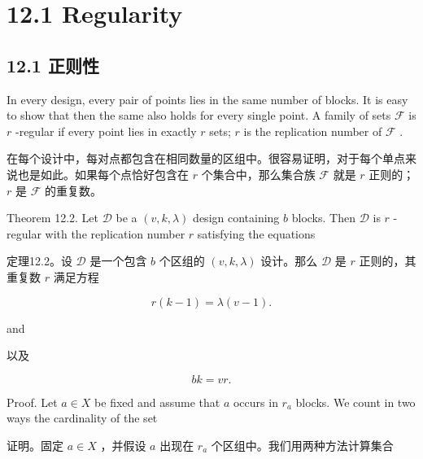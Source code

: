 \documentclass[10pt]{article}
\begin{document}
\section*{12.1 Regularity}

\begin{tcolorbox}\relax
\section*{12.1 正则性}
\end{tcolorbox}

In every design, every pair of points lies in the same number of blocks. It is easy to show that then the same also holds for every single point. A family of sets \(\mathcal{F}\) is \(r\) -regular if every point lies in exactly \(r\) sets; \(r\) is the replication number of \(\mathcal{F}\) .

\begin{tcolorbox}\relax
在每个设计中，每对点都包含在相同数量的区组中。很容易证明，对于每个单点来说也是如此。如果每个点恰好包含在 \(r\) 个集合中，那么集合族 \(\mathcal{F}\) 就是 \(r\) 正则的； \(r\) 是 \(\mathcal{F}\) 的重复数。
\end{tcolorbox}

Theorem 12.2. Let \(\mathcal{D}\) be a \(\left( {v,k,\lambda }\right)\) design containing \(b\) blocks. Then \(\mathcal{D}\) is \(r\) -regular with the replication number \(r\) satisfying the equations

\begin{tcolorbox}\relax
定理12.2。设 \(\mathcal{D}\) 是一个包含 \(b\) 个区组的 \(\left( {v,k,\lambda }\right)\) 设计。那么 \(\mathcal{D}\) 是 \(r\) 正则的，其重复数 \(r\) 满足方程
\end{tcolorbox}

\[
r\left( {k - 1}\right)  = \lambda \left( {v - 1}\right) . \tag{12.1}
\]

and

\begin{tcolorbox}\relax
以及
\end{tcolorbox}

\[
{bk} = {vr}. \tag{12.2}
\]

Proof. Let \(a \in  X\) be fixed and assume that \(a\) occurs in \({r}_{a}\) blocks. We count in two ways the cardinality of the set

\begin{tcolorbox}\relax
证明。固定 \(a \in  X\) ，并假设 \(a\) 出现在 \({r}_{a}\) 个区组中。我们用两种方法计算集合
\end{tcolorbox}
\end{document}
